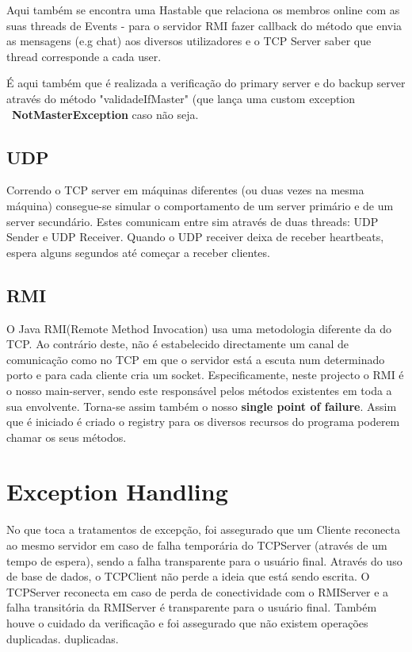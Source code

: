 \documentclass[12pt]{article} %
\begin{document}
Aqui também se encontra uma Hastable que relaciona os membros online com as suas threads de Events - para o servidor RMI fazer callback do método que envia as mensagens (e.g chat) aos diversos utilizadores e o TCP Server saber que thread corresponde a cada user.

É aqui também que é realizada a verificação do primary server e  do backup server através do método "validadeIfMaster" (que lança uma custom exception ~\textbf{NotMasterException} caso não seja.


\subsection{UDP}

Correndo o TCP server em máquinas diferentes (ou duas vezes na mesma máquina) consegue-se simular o comportamento de um server primário e de um server secundário. Estes comunicam entre sim através de duas threads: UDP Sender e UDP Receiver. Quando o UDP receiver deixa de receber heartbeats, espera alguns segundos até começar a receber clientes.


\subsection{RMI}
O Java RMI(Remote Method Invocation) usa uma metodologia diferente da do TCP. Ao contrário deste, não é estabelecido directamente um canal de comunicação como no TCP em que o servidor está a escuta num determinado porto e para cada cliente cria um socket.
Especificamente, neste projecto o RMI é o nosso main-server, sendo este responsável pelos métodos existentes em toda a sua envolvente. Torna-se assim também o nosso \textbf{single point of failure}.
Assim que é iniciado é criado o registry para os diversos recursos do programa poderem chamar os seus métodos. 


\section{Exception Handling}
\label{sec:except}

No que toca a tratamentos de excepção, foi assegurado que um Cliente reconecta ao mesmo servidor em caso de falha temporária do TCPServer (através de um tempo de espera), sendo a falha transparente para o usuário final.
Através do uso de base de dados, o TCPClient não perde a ideia que está sendo escrita.
O TCPServer reconecta em caso de perda de conectividade com o RMIServer e 
a falha transitória da RMIServer é transparente para o usuário final.
Também houve o cuidado da verificação e foi assegurado que não existem operações duplicadas. duplicadas.
\end{document}
